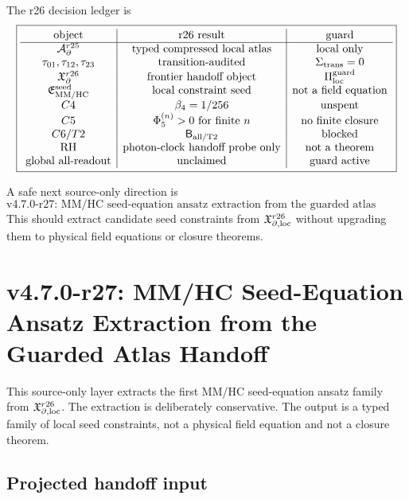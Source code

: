 The r26 decision ledger is
\[
\boxed{
\begin{array}{c|c|c}
\text{object} & \text{r26 result} & \text{guard}\\
\hline
\mathcal A_{\partial}^{r25} & \text{typed compressed local atlas} & \text{local only}\\
\tau_{01},\tau_{12},\tau_{23} & \text{transition-audited} & \Sigma_{\rm trans}=0\\
\mathfrak X_{\partial}^{r26} & \text{frontier handoff object} & \Pi_{\rm loc}^{\rm guard}\\
\mathfrak E_{\rm MM/HC}^{\rm seed} & \text{local constraint seed} & \text{not a field equation}\\
C4 & \beta_4=1/256 & \text{unspent}\\
C5 & \Phi_5^{(n)}>0\text{ for finite }n & \text{no finite closure}\\
C6/T2 & \mathsf B_{\rm all/T2} & \text{blocked}\\
\text{RH} & \text{photon-clock handoff probe only} & \text{not a theorem}\\
\text{global all-readout} & \text{unclaimed} & \text{guard active}
\end{array}
}
\]

A safe next source-only direction is
\[
\boxed{
\text{v4.7.0-r27: MM/HC seed-equation ansatz extraction from the guarded atlas handoff.}
}
\]
This should extract candidate seed constraints from
\(\mathfrak X_{\partial,\rm loc}^{r26}\) without upgrading them to physical field
equations or closure theorems.




\section{v4.7.0-r27: MM/HC Seed-Equation Ansatz Extraction from the Guarded Atlas Handoff}
\label{sec:v470-r27-mmhc-seed-equation-ansatz}

This source-only layer extracts the first MM/HC seed-equation ansatz family from
\(\mathfrak X_{\partial,\rm loc}^{r26}\).  The extraction is deliberately
conservative.  The output is a typed family of local seed constraints, not a
physical field equation and not a closure theorem.

\subsection{Projected handoff input}
\label{subsec:v470-r27-projected-handoff-input}

